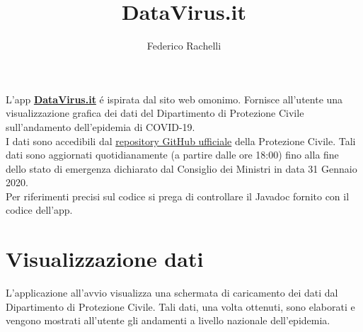 \documentclass{article}
\begin{document}
    \author{Federico Rachelli}
    \title{\vspace{-2cm}DataVirus.it}
    \maketitle

    L'app \textbf{\href{https://datavirus.it}{DataVirus.it}} é ispirata dal sito web omonimo.
    Fornisce all'utente una visualizzazione grafica dei dati del Dipartimento di Protezione Civile sull'andamento dell'epidemia di COVID-19.
    \\
    I dati sono accedibili dal \href{https://github.com/pcm-dpc/COVID-19}{repository GitHub ufficiale} della Protezione Civile. 
    Tali dati sono aggiornati quotidianamente (a partire dalle ore 18:00) fino alla fine dello stato di emergenza dichiarato dal Consiglio dei Ministri in data 31 Gennaio 2020.
    \\
    Per riferimenti precisi sul codice si prega di controllare il Javadoc fornito con il codice dell'app.
    
    \section{Visualizzazione dati}
    L'applicazione all'avvio visualizza una schermata di caricamento dei dati dal Dipartimento di Protezione Civile. 
    Tali dati, una volta ottenuti, sono elaborati e vengono mostrati all'utente gli andamenti a livello nazionale dell'epidemia.
    
\end{document}
